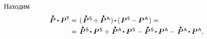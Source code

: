 \begin{otherlanguage}{russian}
\vspace{-1.32em} \noindent Находим
\vspace{0.2em}\[\begin{array}{r@{\hspace{0.25em}}c@{\hspace{0.4em}}l}
\mathdotabove{\bm{P}} \dotp \bm{P}^{\T} & = & (\hspace{0.1em} \mathdotabove{\bm{P}}^{\mathsf{\hspace{0.12ex}S}} \hspace{-0.16ex} + \mathdotabove{\bm{P}}^{\mathsf{\hspace{0.12ex}A}} \hspace{0.05em}) \hspace{-0.1ex} \dotp \hspace{-0.1ex} (\hspace{0.1em} \bm{P}^{\mathsf{\hspace{0.12ex}S}} \hspace{-0.16ex} - \bm{P}^{\mathsf{\hspace{0.12ex}A}} \hspace{0.1ex} \hspace{0.05em}) = \\[0.25em]
& = & \mathdotabove{\bm{P}}^{\mathsf{\hspace{0.12ex}S}} \hspace{-0.2ex}\dotp \bm{P}^{\mathsf{\hspace{0.12ex}S}}
+ \hspace{0.2ex} \mathdotabove{\bm{P}}^{\mathsf{\hspace{0.12ex}A}} \hspace{-0.2ex}\dotp \bm{P}^{\mathsf{\hspace{0.12ex}S}}
- \hspace{0.2ex} \mathdotabove{\bm{P}}^{\mathsf{\hspace{0.12ex}S}} \hspace{-0.2ex}\dotp \bm{P}^{\mathsf{\hspace{0.12ex}A}}
- \hspace{0.2ex} \mathdotabove{\bm{P}}^{\mathsf{\hspace{0.12ex}A}} \hspace{-0.2ex}\dotp \bm{P}^{\mathsf{\hspace{0.12ex}A}} ,
\end{array}\]


\end{otherlanguage}
